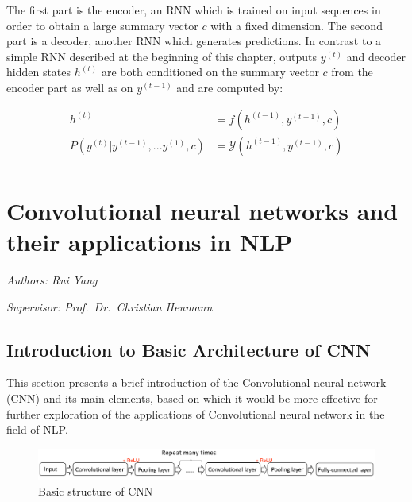\documentclass[]{krantz}
\begin{document}
The first part is the encoder, an RNN which is trained on input sequences in order to obtain a large summary vector \(c\) with a fixed dimension. The second part is a decoder, another RNN which generates predictions. In contrast to a simple RNN described at the beginning of this chapter, outputs \(y^{(t)}\) and decoder hidden states \(h^{(t)}\) are both conditioned on the summary vector \(c\) from the encoder part as well as on \(y^{(t-1)}\) and are computed by:

\begin{align}
h^{(t)} & = f(h^{(t-1)},y^{(t-1)},c) \label{eq:decoder-hidden} \\
P(y^{(t)}|y^{(t-1)},...y^{(1)},c) & = \mathcal{Y}(h^{(t-1)},y^{(t-1)},c) \label{eq:decoder-output} \\
\end{align}

\hypertarget{convolutional-neural-networks-and-their-applications-in-nlp}{%
\chapter{Convolutional neural networks and their applications in NLP}\label{convolutional-neural-networks-and-their-applications-in-nlp}}

\emph{Authors: Rui Yang}

\emph{Supervisor: Prof.~Dr.~Christian Heumann}

\hypertarget{introduction-to-basic-architecture-of-cnn}{%
\section{Introduction to Basic Architecture of CNN}\label{introduction-to-basic-architecture-of-cnn}}

This section presents a brief introduction of the Convolutional neural network (CNN) and its main elements, based on which it would be more effective for further exploration of the applications of Convolutional neural network in the field of NLP.

\begin{figure}[ht]

{\centering \includegraphics[width=1.05\linewidth]{figures/01-03-cnns-and-their-applications-in-nlp/basic_structure} 

}

\caption{Basic structure of CNN}\label{fig:figs}
\end{figure}
\end{document}
